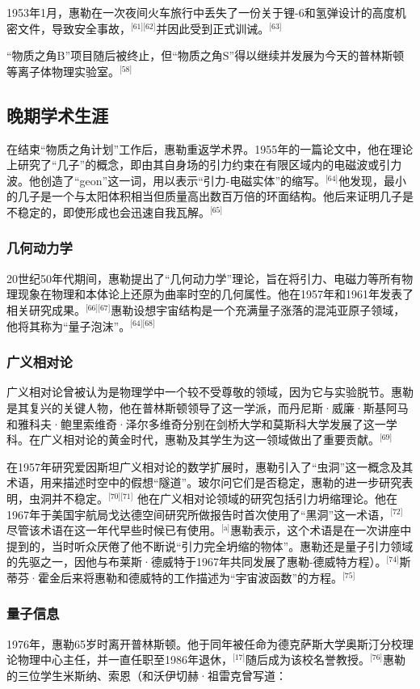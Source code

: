1953年1月，惠勒在一次夜间火车旅行中丢失了一份关于锂-6和氢弹设计的高度机密文件，导致安全事故，\(^\text{[61][62]}\)并因此受到正式训诫。\(^\text{[63]}\)

“物质之角B”项目随后被终止，但“物质之角S”得以继续并发展为今天的普林斯顿等离子体物理实验室。\(^\text{[58]}\)
\subsection{晚期学术生涯}
在结束“物质之角计划”工作后，惠勒重返学术界。1955年的一篇论文中，他在理论上研究了“几子”的概念，即由其自身场的引力约束在有限区域内的电磁波或引力波。他创造了“geon”这一词，用以表示“引力-电磁实体”的缩写。\(^\text{[64]}\)他发现，最小的几子是一个与太阳体积相当但质量高出数百万倍的环面结构。他后来证明几子是不稳定的，即使形成也会迅速自我瓦解。\(^\text{[65]}\)
\subsubsection{几何动力学}
20世纪50年代期间，惠勒提出了“几何动力学”理论，旨在将引力、电磁力等所有物理现象在物理和本体论上还原为曲率时空的几何属性。他在1957年和1961年发表了相关研究成果。\(^\text{[66][67]}\)惠勒设想宇宙结构是一个充满量子涨落的混沌亚原子领域，他将其称为“量子泡沫”。\(^\text{[64][68]}\)
\subsubsection{广义相对论}
广义相对论曾被认为是物理学中一个较不受尊敬的领域，因为它与实验脱节。惠勒是其复兴的关键人物，他在普林斯顿领导了这一学派，而丹尼斯·威廉·斯基阿马和雅科夫·鲍里索维奇·泽尔多维奇分别在剑桥大学和莫斯科大学发展了这一学科。在广义相对论的黄金时代，惠勒及其学生为这一领域做出了重要贡献。\(^\text{[69]}\)

在1957年研究爱因斯坦广义相对论的数学扩展时，惠勒引入了“虫洞”这一概念及其术语，用来描述时空中的假想“隧道”。玻尔问它们是否稳定，惠勒的进一步研究表明，虫洞并不稳定。\(^\text{[70][71]}\) 他在广义相对论领域的研究包括引力坍缩理论。他在1967年于美国宇航局戈达德空间研究所做报告时首次使用了“黑洞”这一术语，\(^\text{[72]}\)尽管该术语在这一年代早些时候已有使用。\(^\text{[a]}\)惠勒表示，这个术语是在一次讲座中提到的，当时听众厌倦了他不断说“引力完全坍缩的物体”。惠勒还是量子引力领域的先驱之一，因他与布莱斯·德威特于1967年共同发展了惠勒-德威特方程）。\(^\text{[74]}\)斯蒂芬·霍金后来将惠勒和德威特的工作描述为“宇宙波函数”的方程。\(^\text{[75]}\)
\subsubsection{量子信息}
1976年，惠勒65岁时离开普林斯顿。他于同年被任命为德克萨斯大学奥斯汀分校理论物理中心主任，并一直任职至1986年退休，\(^\text{[17]}\)随后成为该校名誉教授。\(^\text{[76]}\)惠勒的三位学生米斯纳、索恩（和沃伊切赫·祖雷克曾写道：

